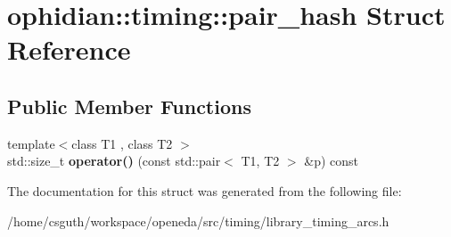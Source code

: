 \hypertarget{structophidian_1_1timing_1_1pair__hash}{\section{ophidian\-:\-:timing\-:\-:pair\-\_\-hash Struct Reference}
\label{structophidian_1_1timing_1_1pair__hash}
}
\subsection*{Public Member Functions}
\begin{DoxyCompactItemize}
\item 
\hypertarget{structophidian_1_1timing_1_1pair__hash_ace13ebf2d7945299ba46908497e65690}{{\footnotesize template$<$class T1 , class T2 $>$ }\\std\-::size\-\_\-t {\bfseries operator()} (const std\-::pair$<$ T1, T2 $>$ \&p) const }\label{structophidian_1_1timing_1_1pair__hash_ace13ebf2d7945299ba46908497e65690}

\end{DoxyCompactItemize}


The documentation for this struct was generated from the following file\-:\begin{DoxyCompactItemize}
\item 
/home/csguth/workspace/openeda/src/timing/library\-\_\-timing\-\_\-arcs.\-h\end{DoxyCompactItemize}

